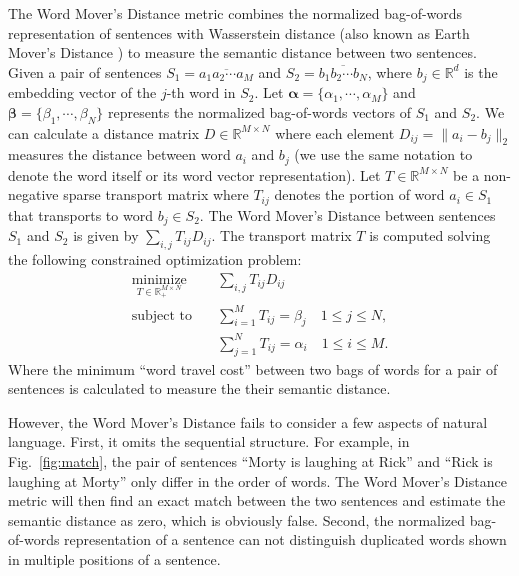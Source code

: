 The Word Mover's Distance metric combines the normalized bag-of-words representation of sentences with Wasserstein distance (also known as Earth Mover's Distance \cite{rubner2000earth}) to measure the semantic distance between two sentences. 
Given a pair of sentences $S_1 = \overline{a_1a_2\cdots a_M}$ and $S_2 = \overline{b_1b_2\cdots b_N}$, where %
$b_j \in \mathbb{R}^d$ is the embedding vector of the $j$-th word in $S_2$. Let $\mathbf \alpha = \{\alpha_1, \cdots, \alpha_M\}$ and $\mathbf \beta = \{\beta_1, \cdots, \beta_N\}$ represents the normalized bag-of-words vectors of $S_1$ and $S_2$. We can calculate a distance matrix $D \in \mathbb{R}^{M\times N}$ where each element
$D_{ij} = \|a_i - b_j\|_2$ measures the distance between word $a_i$ and $b_j$ (we use the same notation to denote the word itself or its word vector representation).
Let $T \in \mathbb{R}^{M\times N}$ be a non-negative sparse transport matrix where $T_{ij}$ denotes the portion of word $a_i \in S_1$ that transports to word $b_j \in S_2$.
The Word Mover's Distance between sentences $S_1$ and $S_2$ is given by $\sum_{i,j} T_{ij} D_{ij}$. The transport matrix $T$ is computed solving the following constrained optimization problem:
\begin{equation}
\label{eq:wmd}
\begin{split}
	\underset{T \in \mathbb{R}_{+}^{M\times N}}{\mbox{minimize}}\quad 		& \sum_{i,j} T_{ij} D_{ij} \\
	\mbox{subject to}\quad & \sum\limits_{i = 1}^{M}  T_{ij} = \beta_j \quad 1\leq j \leq N,\\
			   & \sum\limits_{j = 1}^{N}  T_{ij} = \alpha_i \quad 1\leq i \leq M.
\end{split}
\end{equation}
Where the minimum ``word travel cost'' between two bags of words for a pair of sentences is calculated to measure the their semantic distance.

However, the Word Mover's Distance fails to consider a few aspects of natural language. First, it omits the sequential structure. For example, in Fig.~\ref{fig:match}, the pair of sentences ``Morty is laughing at Rick'' and ``Rick is laughing at Morty'' only differ in the order of words. The Word Mover's Distance metric will then find an exact match between the two sentences and estimate the semantic distance as zero, which is obviously false. Second, the normalized bag-of-words representation of a sentence can not distinguish duplicated words shown in multiple positions of a sentence.

